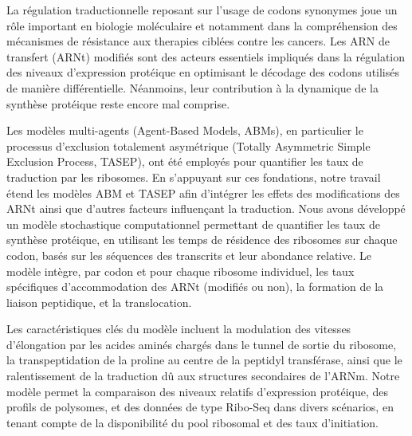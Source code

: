 

La régulation traductionnelle reposant sur l'usage de codons synonymes joue un rôle important en biologie moléculaire et notamment dans la compréhension des mécanismes de résistance aux therapies ciblées contre les cancers. Les ARN de transfert (ARNt) modifiés sont des acteurs essentiels impliqués dans la régulation des niveaux d'expression protéique en optimisant le décodage des codons utilisés de manière différentielle. Néanmoins, leur contribution à la dynamique de la synthèse protéique reste encore mal comprise.

Les modèles multi-agents (Agent-Based Models, ABMs), en particulier le processus d'exclusion totalement asymétrique (Totally Asymmetric Simple Exclusion Process, TASEP), ont été employés pour quantifier les taux de traduction par les ribosomes. En s’appuyant sur ces fondations, notre travail étend les modèles ABM et TASEP afin d’intégrer les effets des modifications des ARNt ainsi que d'autres facteurs influençant la traduction. Nous avons développé un modèle stochastique computationnel permettant de quantifier les taux de synthèse protéique, en utilisant les temps de résidence des ribosomes sur chaque codon, basés sur les séquences des transcrits et leur abondance relative. Le modèle intègre, par codon et pour chaque ribosome individuel, les taux spécifiques d’accommodation des ARNt (modifiés ou non), la formation de la liaison peptidique, et la translocation.

Les caractéristiques clés du modèle incluent la modulation des vitesses d’élongation par les acides aminés chargés dans le tunnel de sortie du ribosome, la transpeptidation de la proline au centre de la peptidyl transférase, ainsi que le ralentissement de la traduction dû aux structures secondaires de l'ARNm. Notre modèle permet la comparaison des niveaux relatifs d’expression protéique, des profils de polysomes, et des données de type Ribo-Seq dans divers scénarios, en tenant compte de la disponibilité du pool ribosomal et des taux d'initiation.

